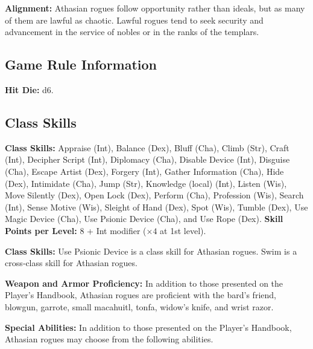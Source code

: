 \textbf{Alignment:} Athasian rogues follow opportunity rather than ideals, but as many of them are lawful as chaotic. Lawful rogues tend to seek security and advancement in the service of nobles or in the ranks of the templars.

\subsection{Game Rule Information}
\textbf{Hit Die:} d6.

\subsection{Class Skills}
\textbf{Class Skills:} Appraise (Int), Balance (Dex), Bluff (Cha), Climb (Str), Craft (Int), Decipher Script (Int), Diplomacy (Cha), Disable Device (Int), Disguise (Cha), Escape Artist (Dex), Forgery (Int), Gather Information (Cha), Hide (Dex), Intimidate (Cha), Jump (Str), Knowledge (local) (Int), Listen (Wis), Move Silently (Dex), Open Lock (Dex), Perform (Cha), Profession (Wis), Search (Int), Sense Motive (Wis), Sleight of Hand (Dex), Spot (Wis), Tumble (Dex), Use Magic Device (Cha), Use Psionic Device (Cha), and Use Rope (Dex).
\textbf{Skill Points per Level:} 8 + Int modifier ($\times4$ at 1st level).


\textbf{Class Skills:} Use Psionic Device is a class skill for Athasian rogues. Swim is a cross‐class skill for Athasian rogues.

\textbf{Weapon and Armor Proficiency:} In addition to those presented on the Player's Handbook, Athasian rogues are proficient with the bard's friend, blowgun, garrote, small
macahuitl, tonfa, widow's knife, and wrist razor.

\textbf{Special Abilities:} In addition to those presented on the Player's Handbook, Athasian rogues may choose from the following abilities.